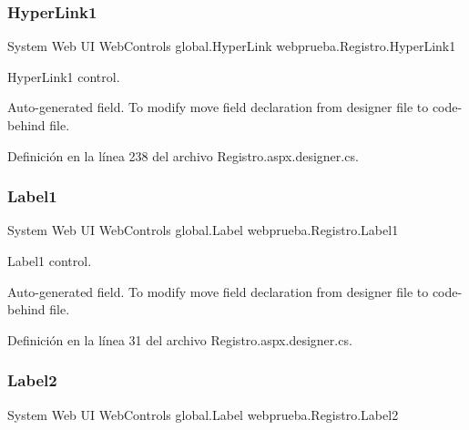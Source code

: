 \subsubsection{\texorpdfstring{HyperLink1}{HyperLink1}}
{\footnotesize\ttfamily System Web UI Web\+Controls global.\+Hyper\+Link webprueba.\+Registro.\+Hyper\+Link1\hspace{0.3cm}{\ttfamily [protected]}}



Hyper\+Link1 control. 

Auto-\/generated field. To modify move field declaration from designer file to code-\/behind file. 

Definición en la línea 238 del archivo Registro.\+aspx.\+designer.\+cs.

\mbox{\label{classwebprueba_1_1_registro_aa8894c18c547390f1f46081b4ddb3475}} 
\subsubsection{\texorpdfstring{Label1}{Label1}}
{\footnotesize\ttfamily System Web UI Web\+Controls global.\+Label webprueba.\+Registro.\+Label1\hspace{0.3cm}{\ttfamily [protected]}}



Label1 control. 

Auto-\/generated field. To modify move field declaration from designer file to code-\/behind file. 

Definición en la línea 31 del archivo Registro.\+aspx.\+designer.\+cs.

\mbox{\label{classwebprueba_1_1_registro_a6353b0bf211c3e814806c0b15f76bbf0}} 
\subsubsection{\texorpdfstring{Label2}{Label2}}
{\footnotesize\ttfamily System Web UI Web\+Controls global.\+Label webprueba.\+Registro.\+Label2\hspace{0.3cm}{\ttfamily [protected]}}



